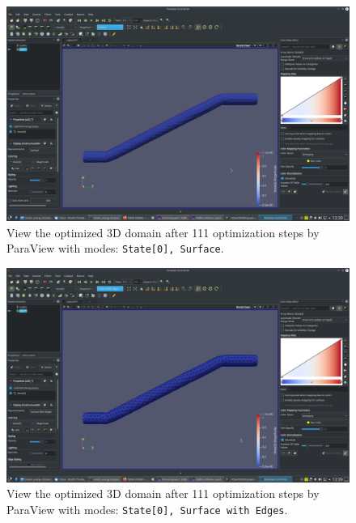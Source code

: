 \documentclass[onsided]{book}
\numberwithin{equation}{section}
\begin{document}
\begin{enumerate}
\begin{enumerate}
        \begin{figure}[H]
            \centering
            \includegraphics[height=0.44\textheight]{optimized_domain_3D_after_111_steps_State0_Surface}
            \caption{View the optimized 3D domain after 111 optimization steps by ParaView with modes: \texttt{State[0], Surface}.}
        \end{figure}
        
        \begin{figure}[H]
            \centering
            \includegraphics[height=0.44\textheight]{optimized_domain_3D_after_111_steps_State0_Surface_with_Edges}
            \caption{View the optimized 3D domain after 111 optimization steps by ParaView with modes: \texttt{State[0], Surface with Edges}.}
        \end{figure}
    

\end{enumerate}
\end{enumerate}
\end{document}
